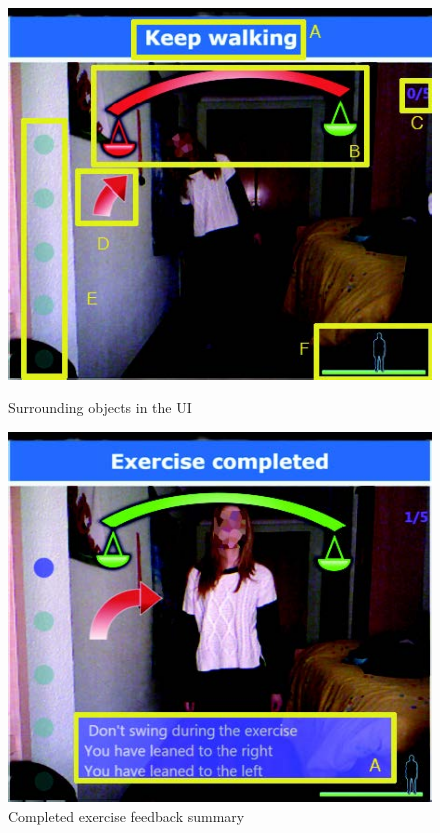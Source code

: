 \begin{figure}[htb]
	\centering
	\begin{minipage}[t]{0.49\linewidth}
		\centering
		\includegraphics[width=1\linewidth]{Pictures/informationUISurroundingObjects}
		\caption{Surrounding objects in the UI \cite{Garrido2013-zs}}
		\label{fig:informationUISurroundingObjects}
	\end{minipage}
	\hfill
	\begin{minipage}[t]{0.49\linewidth}
		\centering
		\includegraphics[width=1\linewidth]{Pictures/informationUIFeedbackSummary}
		\caption{Completed exercise feedback summary \cite{Garrido2013-zs}}
		\label{fig:informationUIFeedbackSummary}
	\end{minipage}
\end{figure}

